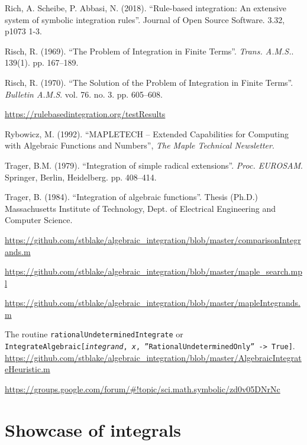 \documentclass[12pt]{article}
\numberwithin{equation}{section}
\theoremstyle{definition}
\begin{document}
\begin{thebibliography}{99}
 Rich, A. Scheibe, P. Abbasi, N. (2018). ``Rule-based integration: An extensive system of symbolic integration rules''. Journal of Open Source Software. 3.32, p1073 1-3.

 Risch, R. (1969). ``The Problem of Integration in Finite Terms''. \textit{ Trans. A.M.S.}. 139(1). pp. 167--189.

 Risch, R. (1970). ``The Solution of the Problem of Integration in Finite Terms''. \textit{Bulletin A.M.S}. 
vol. 76. no. 3. pp. 605--608.

 \url{https://rulebasedintegration.org/testResults}

 Rybowicz, M.  (1992). ``MAPLETECH -- Extended Capabilities for Computing with Algebraic Functions and Numbers'', \textit{The Maple Technical Newsletter}.

 Trager, B.M. (1979). ``Integration of simple radical extensions''. \textit{Proc. EUROSAM}. Springer, Berlin, Heidelberg. pp. 408--414.

 Trager, B. (1984). ``Integration of algebraic functions''. Thesis (Ph.D.) Massachusetts Institute of Technology, Dept. of Electrical Engineering and Computer Science.

 \url{https://github.com/stblake/algebraic_integration/blob/master/comparisonIntegrands.m}

 \url{https://github.com/stblake/algebraic_integration/blob/master/maple_search.mpl}

 \url{https://github.com/stblake/algebraic_integration/blob/master/mapleIntegrands.m}

 The routine \texttt{rationalUndeterminedIntegrate} or \texttt{IntegrateAlgebraic[\textit{integrand}, \textit{x}, ''RationalUndeterminedOnly'' -> True]}. \url{https://github.com/stblake/algebraic_integration/blob/master/AlgebraicIntegrateHeuristic.m}

 \url{https://groups.google.com/forum/#!topic/sci.math.symbolic/zd0v05DNrNc}

\end{thebibliography}

\iffalse
\appendix

\section*{Showcase of integrals}
\end{document}
